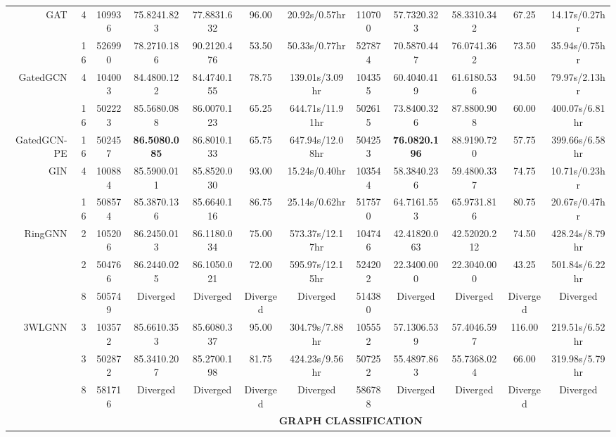\documentclass{article}
\newcommand{\best}[1]{{\color{red}\textbf{#1}}}
\newcommand{\good}[1]{{\color{violet}#1}}
\begin{document}
\begin{table}[t!]
{\begin{tabular}{rr|ccccc|ccccc}
        GAT & 4 & 109936 & 75.8241.823 & 77.8831.632 & 96.00 & 20.92s/0.57hr & 110700 & 57.7320.323 & 58.3310.342 & 67.25 & 14.17s/0.27hr\\
        & 16 & 526990 & 78.2710.186 & 90.2120.476 & 53.50 & 50.33s/0.77hr & 527874 & \good{70.5870.447} & 76.0741.362 & 73.50 & 35.94s/0.75hr\\
        GatedGCN & 4 & 104003 & 84.4800.122 & 84.4740.155 & 78.75 & 139.01s/3.09hr & 104355 & 60.4040.419 & 61.6180.536 & 94.50 & 79.97s/2.13hr\\
        & 16 & 502223 & \good{85.5680.088} & 86.0070.123 & 65.25 & 644.71s/11.91hr & 502615 & \good{73.8400.326} & 87.8800.908 & 60.00 & 400.07s/6.81hr\\
        GatedGCN-PE & 16 & 502457 & \best{86.5080.085} & 86.8010.133 & 65.75 & 647.94s/12.08hr & 504253 & \best{76.0820.196} & 88.9190.720 & 57.75 & 399.66s/6.58hr \\
        \midrule
        GIN & 4 & 100884 & \good{85.5900.011} & 85.8520.030 & 93.00 & 15.24s/0.40hr & 103544 & 58.3840.236 & 59.4800.337 & 74.75 & 10.71s/0.23hr\\
        & 16 & 508574 & 85.3870.136 & 85.6640.116 & 86.75 & 25.14s/0.62hr & 517570 & 64.7161.553 & 65.9731.816 & 80.75 & 20.67s/0.47hr\\
        RingGNN & 2 & 105206 & \good{86.2450.013} & 86.1180.034 & 75.00 & 573.37s/12.17hr & 104746 & 42.41820.063 & 42.52020.212 & 74.50 & 428.24s/8.79hr\\
        & 2 & 504766 & \good{86.2440.025} & 86.1050.021 & 72.00 & 595.97s/12.15hr & 524202 & 22.3400.000 & 22.3040.000 & 43.25 & 501.84s/6.22hr\\
        & 8 & 505749 & \textrm{Diverged} & \textrm{Diverged} & \textrm{Diverged} & \textrm{Diverged} & 514380 & \textrm{Diverged} & \textrm{Diverged} & \textrm{Diverged} & \textrm{Diverged}\\
        3WLGNN & 3 & 103572 & \good{85.6610.353} & 85.6080.337 & 95.00 & 304.79s/7.88hr & 105552 & 57.1306.539 & 57.4046.597 & 116.00 & 219.51s/6.52hr\\
        & 3 & 502872 & \good{85.3410.207} & 85.2700.198 & 81.75 & 424.23s/9.56hr & 507252 & 55.4897.863 & 55.7368.024 & 66.00 & 319.98s/5.79hr \\
        & 8 & 581716 & \textrm{Diverged} & \textrm{Diverged} & \textrm{Diverged} & \textrm{Diverged} & 586788 & \textrm{Diverged} & \textrm{Diverged} & \textrm{Diverged} & \textrm{Diverged}\\
        \midrule
        \midrule
        & & \multicolumn{10}{c}{\textbf{GRAPH CLASSIFICATION}} \\

\end{tabular}}
\end{table}
\end{document}
